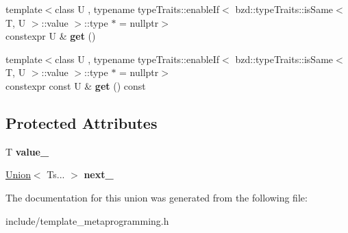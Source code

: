 \begin{DoxyCompactItemize}
\item 
\mbox{\label{unionbzd_1_1tmp_1_1impl_1_1Union_ac5126c79c6c06a28864d2c7d8bf111d8}} 
{\footnotesize template$<$class U , typename type\+Traits\+::enable\+If$<$ bzd\+::type\+Traits\+::is\+Same$<$ T, U $>$\+::value $>$\+::type $\ast$  = nullptr$>$ }\\constexpr U \& {\bfseries get} ()
\item 
\mbox{\label{unionbzd_1_1tmp_1_1impl_1_1Union_aef02b0d662b724f6a500c83b2683b33a}} 
{\footnotesize template$<$class U , typename type\+Traits\+::enable\+If$<$ bzd\+::type\+Traits\+::is\+Same$<$ T, U $>$\+::value $>$\+::type $\ast$  = nullptr$>$ }\\constexpr const U \& {\bfseries get} () const
\end{DoxyCompactItemize}
\subsection*{Protected Attributes}
\begin{DoxyCompactItemize}
\item 
\mbox{\label{unionbzd_1_1tmp_1_1impl_1_1Union_acbce1c71cd02c3e95300dce1c217f534}} 
T {\bfseries value\+\_\+}
\item 
\mbox{\label{unionbzd_1_1tmp_1_1impl_1_1Union_a056247bb1e0f008072d6378dcb0f5c99}} 
\hyperlink{unionbzd_1_1tmp_1_1impl_1_1Union}{Union}$<$ Ts... $>$ {\bfseries next\+\_\+}
\end{DoxyCompactItemize}


The documentation for this union was generated from the following file\+:\begin{DoxyCompactItemize}
\item 
include/template\+\_\+metaprogramming.\+h\end{DoxyCompactItemize}
